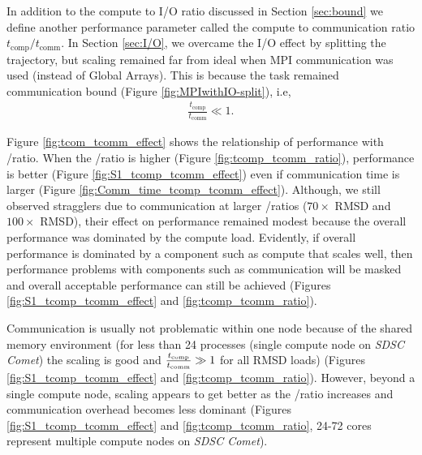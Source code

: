 \label{sec:tcomm}
In addition to the compute to I/O ratio discussed in Section \ref{sec:bound} we define another performance parameter called the compute to communication ratio $t_{\text{comp}}/t_{\text{comm}}$.
In Section \ref{sec:I/O}, we overcame the I/O effect by splitting the trajectory, but scaling remained far from ideal when MPI communication was used (instead of  Global Arrays).
This is because the task remained communication bound (Figure \ref{fig:MPIwithIO-split}), i.e, 
\begin{gather*}
  \frac{t_{\text{comp}}}{t_{\text{comm}}} \ll 1.
\end{gather*}

Figure \ref{fig:tcom_tcomm_effect} shows the relationship of performance with \tcomp/\tcomm ratio.
When the \tcomp/\tcomm ratio is higher (Figure \ref{fig:tcomp_tcomm_ratio}), performance is better (Figure \ref{fig:S1_tcomp_tcomm_effect}) even if communication time is larger (Figure \ref{fig:Comm_time_tcomp_tcomm_effect}).
Although, we still observed stragglers due to communication at larger \tcomp/\tcomm ratios ($70\times$ RMSD and $100\times$ RMSD), their effect on performance remained modest because the overall performance was dominated by the compute load. 
Evidently, if overall performance is dominated by a component such as compute that scales well, then performance problems with components such as communication will be masked and overall acceptable performance can still be achieved (Figures \ref{fig:S1_tcomp_tcomm_effect} and \ref{fig:tcomp_tcomm_ratio}).

Communication is usually not problematic within one node because of the shared memory environment (for less than 24 processes (single compute node on \emph{SDSC Comet}) the scaling is good and $\frac{{t}_{\text{comp}}}{t_{\text{comm}}} \gg 1$ for all RMSD loads) (Figures \ref{fig:S1_tcomp_tcomm_effect} and \ref{fig:tcomp_tcomm_ratio}).
However, beyond a single compute node, scaling appears to get better as the \tcomp/\tcomm ratio increases and communication overhead becomes less dominant (Figures \ref{fig:S1_tcomp_tcomm_effect} and \ref{fig:tcomp_tcomm_ratio}, 24-72 cores represent multiple compute nodes on \emph{SDSC Comet}).

